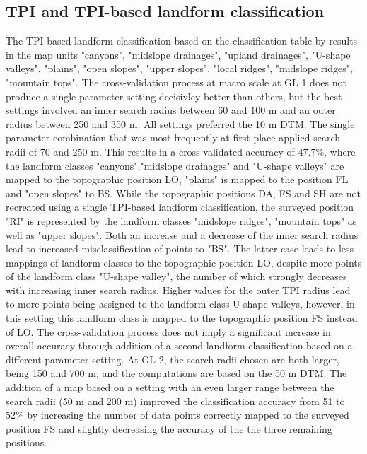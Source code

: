 \documentclass[preprint,12pt,authoryear]{elsarticle}
\begin{document}
\subsection{TPI and TPI-based landform classification}
The TPI-based landform classification based on the  classification table by \cite{Weiss2000} results in the map units "canyons", "midslope drainages", "upland drainages", "U-shape valleys", "plains", "open slopes", "upper slopes", "local ridges", "midslope ridges", "mountain tops". The cross-validation process at macro scale at GL 1 does not produce a single parameter setting decisivley better than others, but the best settings involved an inner search radius between 60 and 100 m and an outer radius between 250  and 350 m. All settings preferred the 10 m DTM. The single parameter combination that was most frequently at first place applied search radii of 70 and 250 m. This results in a cross-validated accuracy of 47.7\%, where the landform classes "canyons","midslope drainages" and "U-shape valleys" are mapped to the topographic position LO, "plains" is mapped to the position FL and "open slopes" to BS. While the topographic positions DA, FS and SH are not recreated using a single TPI-based landform classification, the surveyed position "RI" is represented by the landform classes "midslope ridges", "mountain tops" as well as "upper slopes". Both an increase and a decrease of the inner search radius lead to increased misclassification of points to "BS". The latter case leads to less mappings of landform classes to the topographic position LO, despite more points of the landform class "U-shape valley", the number of which strongly decreases with increasing inner search radius. Higher values for the outer TPI radius lead to more points being assigned to the landform class U-shape valleys, however, in this setting this landform class is mapped to the topographic position FS instead of LO. The cross-validation process does not imply a significant increase in overall accuracy through addition of a second landform classification based on a different parameter setting. At GL 2, the search radii chosen are both larger, being 150 and 700 m, and the computations are based on the 50 m DTM. The addition of a map based on a setting with an even larger range between the search radii (50 m and 200 m) improved the classification accuracy from 51 to 52\% by increasing the number of data points correctly mapped to the surveyed position FS and slightly decreasing the accuracy of the the three remaining positions.  
\end{document}
